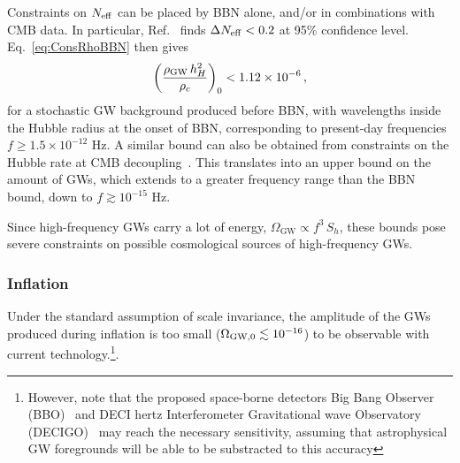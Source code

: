 \documentclass[11pt,a4paper]{article}
\begin{document}
Constraints on $N_{\rm eff}$ can be placed by BBN alone, and/or in combinations with CMB data. In particular, Ref.~\cite{Cyburt:2015mya} finds $\Delta N_{\rm eff} < 0.2$ at 95\% confidence level. Eq.~\eqref{eq:ConsRhoBBN} then gives
\begin{eqnarray}\label{eq:BBNbound}
\left(\frac{\rho_{\rm GW} \, h_H^2}{\rho_c}\right)_0 < 1.12 \times 10^{-6}\,,
\label{eq:BBN}
\end{eqnarray}
for a stochastic GW background produced before BBN, with wavelengths inside the Hubble radius at the onset of BBN, corresponding to present-day frequencies $f \geq 1.5 \times 10^{-12}$ Hz.
%
A similar bound can also be obtained from constraints on the Hubble rate at CMB decoupling~\cite{Smith:2006nka,Sendra:2012wh,Pagano:2015hma, Clarke:2020bil}. This translates into an upper bound on the amount of GWs, which extends to a greater frequency range than the BBN bound, down to $f \gtrsim 10^{-15}$ Hz.

Since high-frequency GWs carry a lot of energy, $\Omega_\text{GW} \propto f^3 \, S_h$, these bounds pose severe constraints on possible cosmological sources of high-frequency GWs.


\subsubsection{Inflation}
\label{sec:Inflation}
Under the standard assumption of scale invariance, the amplitude of the GWs produced during inflation is too small ($\Omega_{\rm GW, 0} \lesssim 10^{-16}$) to be observable with current technology.\footnote{However, note that the proposed space-borne detectors Big Bang Observer (BBO)~\cite{BBO} and DECI hertz Interferometer Gravitational wave Observatory (DECIGO)~\cite{Seto:2001qf} may reach the necessary sensitivity, assuming that astrophysical GW foregrounds will be able to be substracted to this accuracy}.
\end{document}
